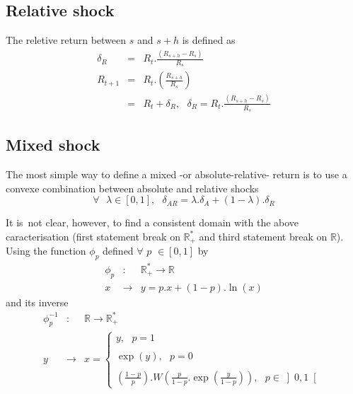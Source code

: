 \documentclass[3pt]{article}
\begin{document}
\subsection{Relative shock}

\bigskip The reletive return between $s$ and $s+h$ is defined as%
\begin{eqnarray*}
\delta _{R} &=&R_{t}.\frac{\left( R_{s+h}-R_{s}\right) }{R_{s}} \\
R_{t+1} &=&R_{t}.\left( \frac{R_{s+h}}{R_{s}}\right)  \\
&=&R_{t}+\delta _{R},\text{ \ \ }\delta _{R}=R_{t}.\frac{\left(
R_{s+h}-R_{s}\right) }{R_{s}}
\end{eqnarray*}

\subsection{Mixed shock}

The most simple way to define a mixed -or absolute-relative- return is to
use a convexe combination between absolute and relative shocks 
\begin{equation*}
\forall \text{ }\lambda \in \left[ 0,1\right] ,\text{ \ \ }\delta
_{AR}=\lambda .\delta _{A}+(1-\lambda ).\delta _{R}
\end{equation*}

It is\ not clear, however, to find a consistent domain with the above
caracterisation (first statement break on $\mathbb{R}_{+}^{\ast }$ and third
statement break on $\mathbb{R}$). Using the function $\phi _{p}$ defined $%
\forall $ $p$ $\in \left[ 0,1\right] $ by%
\begin{eqnarray*}
\phi _{p} &:&\mathbb{R}_{+}^{\ast }\rightarrow \mathbb{R} \\
x &\rightarrow &y=p.x+(1-p).\ln (x)
\end{eqnarray*}%
and its inverse 
\begin{eqnarray*}
\phi _{p}^{-1} &:&\mathbb{R}\rightarrow \mathbb{R}_{+}^{\ast } \\
y &\rightarrow &x=\left\{ 
\begin{array}{c}
y,\text{ \ \ \ \ \ \ \ \ \ \ \ \ \ \ \ \ \ \ \ \ \ \ \ \ \ \ \ \ \ \ \ \ }p=1
\\ 
\\ 
\exp (y),\text{ \ \ \ \ \ \ \ \ \ \ \ \ \ \ \ \ \ \ \ \ \ \ \ \ \ }p=0 \\ 
\\ 
\left( \frac{1-p}{p}\right) .W\left( \frac{p}{1-p}.\exp \left( \frac{y}{1-p}%
\right) \right) ,\text{ }p\in \left] 0,1\right[ 
\end{array}%
\right. 
\end{eqnarray*}
\end{document}
